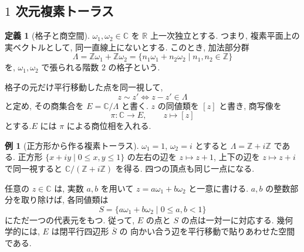 \documentclass[dvipdfmx,a4paper,11pt]{article} %
\newcommand{\R}{\mathbb{R}}
\newcommand{\Z}{\mathbb{Z}}
\newcommand{\C}{\mathbb{C}}
\theoremstyle{definition}
\numberwithin{equation}{section}
\newtheorem{dfn}[thm]{定義}
\newtheorem{exa}[thm]{例}
\begin{document}
\subsection{$1$ 次元複素トーラス}\label{O-S027}


\begin{dfn}[格子と商空間]
$\omega_1,\omega_2\in\C$ を $\R$ 上一次独立とする.
つまり, 複素平面上の実ベクトルとして, 同一直線上にないとする.
このとき, 加法部分群
\[
\Lambda=\Z\omega_1+\Z\omega_2
=\{n_1\omega_1+n_2\omega_2\mid n_1,n_2\in\Z\}
\]
を, $\omega_1,\omega_2$ で張られる階数 $2$ の格子という.

格子の元だけ平行移動した点を同一視して, 
\[
z\sim z'
\iff z-z'\in\Lambda
\]
と定め, その商集合を $E=\C/\Lambda$ と書く.
$z$ の同値類を $[z]$ と書き, 商写像を
\[
\pi:\C\to E,\qquad z\mapsto[z]
\]
とする.$E$ には $\pi$ による商位相を入れる.
\end{dfn}

\begin{exa}[正方形から作る複素トーラス]
$\omega_1=1$, $\omega_2=i$ とすると $\Lambda=\Z+i\Z$ である.
正方形 $\{x+iy\mid0\leq x,y\leq1\}$ の左右の辺を $z\mapsto z+1$,
上下の辺を $z\mapsto z+i$ で同一視すると $\C/(\Z+i\Z)$ を得る.
四つの頂点も同じ一点になる.
\begin{center}
\end{center}
\end{exa}

任意の $z\in\C$ は, 実数 $a,b$ を用いて
$z=a\omega_1+b\omega_2$ と一意に書ける.
$a,b$ の整数部分を取り除けば, 各同値類は
\[
S=\{a\omega_1+b\omega_2\mid 0\leq a,b<1\}
\]
にただ一つの代表元をもつ.
従って, $E$ の点と $S$ の点は一対一に対応する.
幾何学的には, $E$ は閉平行四辺形 $\overline S$ の
向かい合う辺を平行移動で貼りあわせた空間である.
\end{document}
